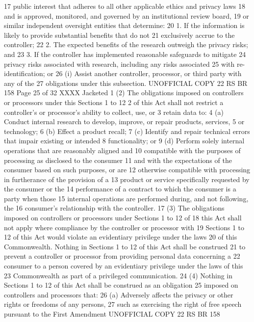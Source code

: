 17 public interest that adheres to all other applicable ethics and privacy laws
18 and is approved, monitored, and governed by an institutional review board,
19 or similar independent oversight entities that determine:
20 1. If the information is likely to provide substantial benefits that do not
21 exclusively accrue to the controller;
22 2. The expected benefits of the research outweigh the privacy risks; and
23 3. If the controller has implemented reasonable safeguards to mitigate
24 privacy risks associated with research, including any risks associated
25 with re-identification; or
26 (i) Assist another controller, processor, or third party with any of the
27 obligations under this subsection.
UNOFFICIAL COPY 22 RS BR 158
Page 25 of 32
XXXX Jacketed
1 (2) The obligations imposed on controllers or processors under this Sections 1 to 12
2 of this Act shall not restrict a controller's or processor's ability to collect, use, or
3 retain data to:
4 (a) Conduct internal research to develop, improve, or repair products, services,
5 or technology;
6 (b) Effect a product recall;
7 (c) Identify and repair technical errors that impair existing or intended
8 functionality; or
9 (d) Perform solely internal operations that are reasonably aligned and
10 compatible with the purposes of processing as disclosed to the consumer
11 and with the expectations of the consumer based on such purposes, or are
12 otherwise compatible with processing in furtherance of the provision of a
13 product or service specifically requested by the consumer or the
14 performance of a contract to which the consumer is a party when those
15 internal operations are performed during, and not following, the
16 consumer's relationship with the controller.
17 (3) The obligations imposed on controllers or processors under Sections 1 to 12 of
18 this Act shall not apply where compliance by the controller or processor with
19 Sections 1 to 12 of this Act would violate an evidentiary privilege under the laws
20 of this Commonwealth. Nothing in Sections 1 to 12 of this Act shall be construed
21 to prevent a controller or processor from providing personal data concerning a
22 consumer to a person covered by an evidentiary privilege under the laws of this
23 Commonwealth as part of a privileged communication.
24 (4) Nothing in Sections 1 to 12 of this Act shall be construed as an obligation
25 imposed on controllers and processors that:
26 (a) Adversely affects the privacy or other rights or freedoms of any persons,
27 such as exercising the right of free speech pursuant to the First Amendment 
UNOFFICIAL COPY 22 RS BR 158
